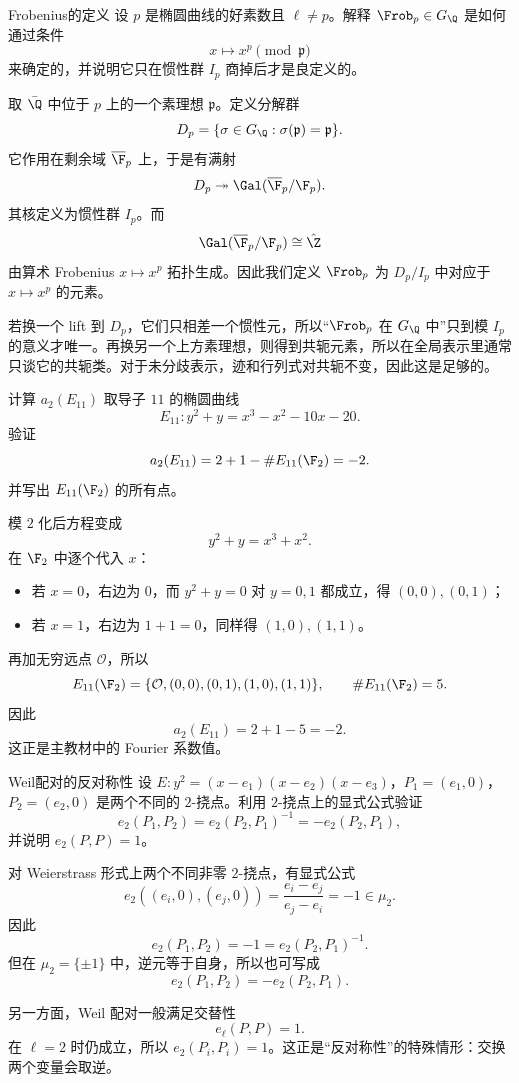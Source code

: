 \begin{problem}{Frobenius的定义}
设 $p$ 是椭圆曲线的好素数且 $\ell\neq p$。解释 $\Frob_p\in G_\Q$ 是如何通过条件
\[
x\longmapsto x^p \pmod{\mathfrak p}
\]
来确定的，并说明它只在惯性群 $I_p$ 商掉后才是良定义的。
\end{problem}
\begin{solution}
取 $\bar\Q$ 中位于 $p$ 上的一个素理想 $\mathfrak p$。定义分解群
\[
D_p=\{\sigma\in G_\Q:\sigma(\mathfrak p)=\mathfrak p\}.
\]
它作用在剩余域 $\overline{\F}_p$ 上，于是有满射
\[
D_p\twoheadrightarrow \Gal(\overline{\F}_p/\F_p).
\]
其核定义为惯性群 $I_p$。而
\[
\Gal(\overline{\F}_p/\F_p)\cong \hat\Z
\]
由算术 Frobenius $x\mapsto x^p$ 拓扑生成。因此我们定义 $\Frob_p$ 为 $D_p/I_p$ 中对应于 $x\mapsto x^p$ 的元素。

若换一个 lift 到 $D_p$，它们只相差一个惯性元，所以“$\Frob_p$ 在 $G_\Q$ 中”只到模 $I_p$ 的意义才唯一。再换另一个上方素理想，则得到共轭元素，所以在全局表示里通常只谈它的共轭类。对于未分歧表示，迹和行列式对共轭不变，因此这是足够的。
\end{solution}

\begin{problem}{计算 $a_2(E_{11})$}
取导子 $11$ 的椭圆曲线
\[
E_{11}: y^2+y=x^3-x^2-10x-20.
\]
验证
\[
a_2(E_{11})=2+1-\#E_{11}(\F_2)=-2.
\]
并写出 $E_{11}(\F_2)$ 的所有点。
\end{problem}
\begin{solution}
模 $2$ 化后方程变成
\[
y^2+y=x^3+x^2.
\]
在 $\F_2$ 中逐个代入 $x$：
\begin{itemize}
  \item 若 $x=0$，右边为 $0$，而 $y^2+y=0$ 对 $y=0,1$ 都成立，得 $(0,0),(0,1)$；
  \item 若 $x=1$，右边为 $1+1=0$，同样得 $(1,0),(1,1)$。
\end{itemize}
再加无穷远点 $\mathcal O$，所以
\[
E_{11}(\F_2)=\{\mathcal O,(0,0),(0,1),(1,0),(1,1)\},
\qquad \#E_{11}(\F_2)=5.
\]
因此
\[
a_2(E_{11})=2+1-5=-2.
\]
这正是主教材中的 Fourier 系数值。
\end{solution}

\begin{problem}{Weil配对的反对称性}
设 $E:y^2=(x-e_1)(x-e_2)(x-e_3)$，$P_1=(e_1,0)$，$P_2=(e_2,0)$ 是两个不同的 $2$-挠点。利用 $2$-挠点上的显式公式验证
\[
e_2(P_1,P_2)=e_2(P_2,P_1)^{-1}=-e_2(P_2,P_1),
\]
并说明 $e_2(P,P)=1$。
\end{problem}
\begin{solution}
对 Weierstrass 形式上两个不同非零 $2$-挠点，有显式公式
\[
e_2((e_i,0),(e_j,0))=\frac{e_i-e_j}{e_j-e_i}=-1\in \mu_2.
\]
因此
\[
e_2(P_1,P_2)=-1=e_2(P_2,P_1)^{-1}.
\]
但在 $\mu_2=\{\pm1\}$ 中，逆元等于自身，所以也可写成
\[
e_2(P_1,P_2)=-e_2(P_2,P_1).
\]

另一方面，Weil 配对一般满足交替性
\[
e_\ell(P,P)=1.
\]
在 $\ell=2$ 时仍成立，所以 $e_2(P_i,P_i)=1$。这正是“反对称性”的特殊情形：交换两个变量会取逆。
\end{solution}

